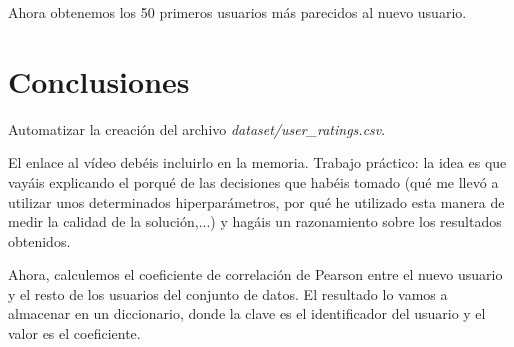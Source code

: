 \documentclass{uimppracticas}
\begin{document}
Ahora obtenemos los 50 primeros usuarios más parecidos al nuevo usuario.
\newpage

\section{Conclusiones}

Automatizar la creación del archivo \textit{dataset/user\_ratings.csv}.

El enlace al vídeo debéis incluirlo en la memoria. Trabajo práctico: la idea es que vayáis explicando el porqué de las decisiones que habéis tomado (qué me llevó a utilizar unos determinados hiperparámetros, por qué he utilizado esta manera de medir la calidad de la solución,...) y hagáis un razonamiento sobre los resultados obtenidos.

Ahora, calculemos el coeficiente de correlación de Pearson entre el nuevo usuario y el resto de los usuarios del conjunto de datos. El resultado lo vamos a almacenar en un diccionario, donde la clave es el identificador del usuario y el valor es el coeficiente.


\newpage

\renewcommand{\refname}{Bibliografía}


	
\end{document}
